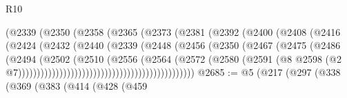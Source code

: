\begin{lexlean}{R10}
\begin{coremodule}
                                      (@2339
                                        (@2350
                                          (@2358
                                            (@2365
                                              (@2373
                                                (@2381
                                                  (@2392
                                                    (@2400
                                                      (@2408
                                                        (@2416
                                                          (@2424
                                                            (@2432
                                                              (@2440
                                                                (@2339
                                                                  (@2448
                                                                    (@2456
                                                                      (@2350
                                                                        (@2467
                                                                          (@2475
                                                                            (@2486
                                                                              (@2494
                                                                                (@2502
                                                                                  (@2510
                                                                                    (@2556
                                                                                      (@2564
                                                                                        (@2572
                                                                                          (@2580
                                                                                            (@2591
                                                                                              (@8
                                                                                                @2598
                                                                                                (@2
                                                                                                  @7)))))))))))))))))))))))))))))))))))))))))))))))
@2685 := @5
    (@217
      (@297
        (@338
          (@369
            (@383
              (@414
                (@428
                  (@459

\end{coremodule}
\end{lexlean}
